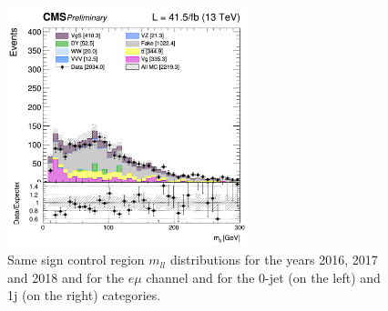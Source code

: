 \documentclass[a4paper, 10pt, openright]{report}
\begin{document}
\begin{figure}[htbp]
{\begin{minipage}[b]{.48\textwidth}
\end{minipage}\hfill
\begin{minipage}[b]{.48\textwidth}
\includegraphics[width=7cm, height=7cm]{figs/SSemu1j2017.png}
\end{minipage} \hfill
}
\caption{Same sign control region $m_{ll}$ distributions for the years 2016, 2017 and 2018 and for the $e \mu$ channel and for the 0-jet (on the left) and 1j (on the right) categories.}
\label{fig:SSCR}
\end{figure}
\end{document}
